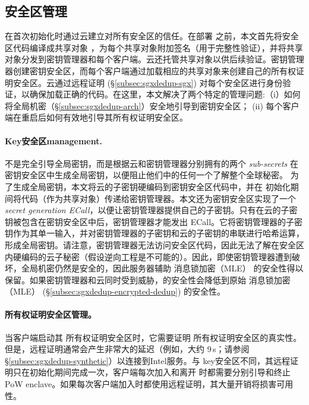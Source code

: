 \subsection{安全区管理}
\label{subsec:sgxdedup-enclave-management}

\sysnameS 在首次初始化时通过云建立对所有安全区的信任。在部署 \sysnameS 之前，本文首先将安全区代码编译成共享对象 \cite{sgx}，为每个共享对象附加签名（用于完整性验证），并将共享对象分发到密钥管理器和每个客户端。云还托管共享对象以供后续验证。密钥管理器创建密钥安全区，而每个客户端通过加载相应的共享对象来创建自己的所有权证明安全区。云通过远程证明 (\S\ref{subsec:sgxdedup-sgx}) 对每个安全区进行身份验证，以确保加载正确的代码。在这里，本文解决了两个特定的管理问题:（i）如何将全局机密（\S\ref{subsec:sgxdedup-arch}）安全地引导到密钥安全区； (ii) 每个客户端在重启后如何有效地引导其所有权证明安全区。

\paragraph*{Key安全区management.} \sysnameS 不是完全引导全局密钥，而是根据云和密钥管理器分别拥有的两个 \textit{ sub-secrets} 在密钥安全区中生成全局密钥，以便阻止他们中的任何一个了解整个全球秘密。
为了生成全局密钥，本文将云的子密钥硬编码到密钥安全区代码中，并在 \sysnameS 初始化期间将代码（作为共享对象）传递给密钥管理器。本文还为密钥安全区实现了一个\textit{ secret generation ECall}，以便让密钥管理器提供自己的子密钥。只有在云的子密钥被包含在密钥安全区中后，密钥管理器才能发出 ECall。它将密钥管理器的子密钥作为其单一输入，并对密钥管理器的子密钥和云的子密钥的串联进行哈希运算，形成全局密钥。请注意，密钥管理器无法访问安全区代码，因此无法了解在安全区内硬编码的云子秘密（假设逆向工程是不可能的）。因此，即使密钥管理器遭到破坏，全局机密仍然是安全的，因此服务器辅助 消息锁加密（MLE） 的安全性得以保留。如果密钥管理器和云同时受到威胁，\sysnameS 的安全性会降低到原始 消息锁加密（MLE） (\S\ref{subsec:sgxdedup-encrypted-dedup}) 的安全性。

\paragraph*{所有权证明安全区管理。} 当客户端启动其 所有权证明安全区时，它​​需要证明 所有权证明安全区的真实性。但是，远程证明通常会产生非常大的延迟（例如，大约 9\,s；请参阅 \S\ref{subsec:sgxdedup-synthetic}）以连接到Intel服务。与 key安全区不同，其远程证明只在初始化期间完成一次，客户端每次加入和离开 \sysnameS 时都需要分别引导和终止 PoW enclave。如果每次客户端加入时都使用远程证明，其大量开销将损害可用性。

